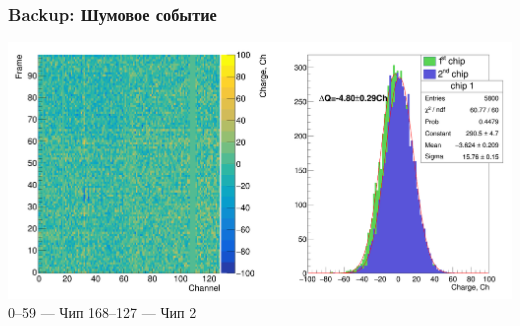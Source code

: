 \documentclass[14pt]{beamer}
\begin{document}


\begin{frame}[c]
\frametitle{Backup: Шумовое событие}
\includegraphics[width=1\linewidth]{Noise_no_filtering.png}
\hspace*{20pt}\tiny{0--59 --- Чип 1}\hspace*{30pt}\tiny{68--127 --- Чип 2}
\end{frame}
\end{document}
